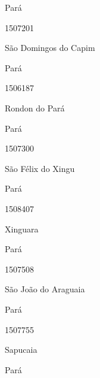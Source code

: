 \documentclass[
  letterpaper,
]{report}
\begin{document}
\n    

\n    

\n      

Pará

\n      

1507201

\n      

São Domingos do Capim

\n    

\n    

\n      

Pará

\n      

1506187

\n      

Rondon do Pará

\n    

\n    

\n      

Pará

\n      

1507300

\n      

São Félix do Xingu

\n    

\n    

\n      

Pará

\n      

1508407

\n      

Xinguara

\n    

\n    

\n      

Pará

\n      

1507508

\n      

São João do Araguaia

\n    

\n    

\n      

Pará

\n      

1507755

\n      

Sapucaia

\n    

\n    

\n      

Pará

\n      
\end{document}
